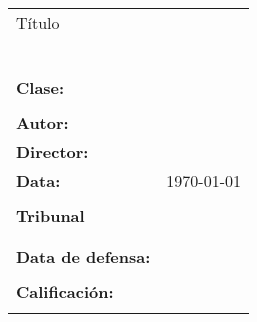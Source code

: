 %
%
\thispagestyle{plain}
\section*{}


\begin{tabular}{p{2cm}p{11cm}}
	\large{Título} & \\
	& \textbf{\large{\titulogalego}} \\
	\\
	& \textbf{\large{\titulo}} \\
	\\
	& \textbf{\large{\tituloenglish}} \\
	\\
	\large{\textbf{Clase:}} & \large{\proyectotipo} \\
	\\
	\large{\textbf{Autor:}} & \large{\autor} \\
	\large{\textbf{Director:}} & \large{\director} \\
	\large{\textbf{Data:}} & \large{\today} \\
	\\
	\large{\textbf{Tribunal}} & \\
	& \vspace{3cm} \\
	\\
	\large{\textbf{Data de defensa:}} & \\
	\\
	\large{\textbf{Calificación:}} & \\
	\\
\end{tabular}
